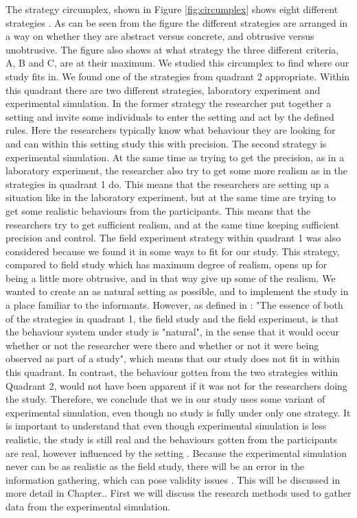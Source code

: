 The strategy circumplex, shown in Figure \ref{fig:circumplex} shows eight different strategies \cite{McGrath}. As can be seen from the figure the different strategies are arranged in a way on whether they are abstract versus concrete, and obtrusive versus unobtrusive. The figure also shows at what strategy the three different criteria, A, B and C, are at their maximum. We studied this circumplex to find where our study fits in. We found one of the strategies from quadrant 2 appropriate. Within this quadrant there are two different strategies, laboratory experiment and experimental simulation. In the former strategy the researcher put together a setting and invite some individuals to enter the setting and act by the defined rules. Here the researchers typically know what behaviour they are looking for and can within this setting study this with precision. The second strategy is experimental simulation. At the same time as trying to get the precision, as in a laboratory experiment, the researcher also try to get some more realism as in the strategies in quadrant 1 do. This means that the researchers are setting up a situation like in the laboratory experiment, but at the same time are trying to get some realistic behaviours from the participants. This means that the researchers try to get sufficient realism, and at the same time keeping sufficient precision and control. The field experiment strategy within quadrant 1 was also considered because we found it in some ways to fit for our study. This strategy, compared to field study which has maximum degree of realism, opens up for being a little more obtrusive, and in that way give up some of the realism. We wanted to create an as natural setting as possible, and to implement the study in a place familiar to the informants. However, as defined in \cite{McGrath}:  "The essence of both of the strategies in quadrant 1, the field study and the field experiment, is that the behaviour system under study is "natural", in the sense that it would occur whether or not the researcher were there and whether or not it were being observed as part of a study", which means that our study does not fit in within this quadrant. In contrast, the behaviour gotten from the two strategies within Quadrant 2, would not have been apparent if it was not for the researchers doing the study. Therefore, we conclude that we in our study uses some variant of experimental simulation, even though no study is fully under only one strategy. It is important to understand that even though experimental simulation is less realistic, the study is still real and the behaviours gotten from the participants are real, however influenced by the setting \cite{McGrath}. Because the experimental simulation never can be as realistic as the field study, there will be an error in the information gathering, which can pose validity issues \cite{alsos}. This will be discussed in more detail in Chapter.. First we will discuss the research methods used to gather data from the experimental simulation. 

